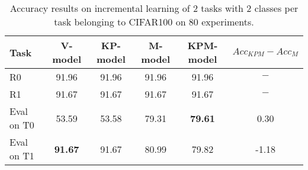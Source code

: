 \begin{table}[H]
\centering
\begin{tabular}{lccccc}
\toprule
Task  & V-model & KP-model & M-model & KPM-model & $Acc_{KPM}-Acc_{M}$ \\
\midrule
R0 & 91.96 & 91.96 & 91.96 & 91.96 & $-$ \\
R1 & 91.67 & 91.67 & 91.67 & 91.67 & $-$ \\

 \hline 
Eval on T0 & 53.59 & 53.58 & 79.31 & \textbf{79.61} & 0.30 \\
Eval on T1 & \textbf{91.67} & 91.67 & 80.99 & 79.82 & -1.18 \\
\bottomrule
\end{tabular}
\caption{Accuracy results on incremental learning of 2 tasks with 2 classes per task belonging to CIFAR100 on 80 experiments.}
\end{table}
